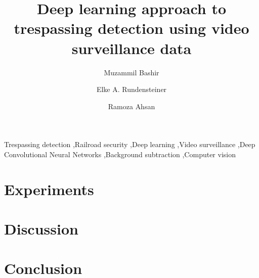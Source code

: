 \documentclass[preprint,3p,times,twocolumn]{elsarticle}
\begin{document}
\begin{frontmatter}
\title{Deep learning approach to trespassing detection using video surveillance data}


\author{Muzammil Bashir}
\author{Elke A. Rundensteiner}
\author{Ramoza Ahsan}

\address{Department of Computer Science, Worcester Polytechnic Institute, United States}





\begin{keyword}
Trespassing detection \sep Railroad security \sep Deep learning \sep Video surveillance \sep Deep Convolutional Neural Networks \sep Background subtraction \sep Computer vision
\end{keyword}

\end{frontmatter}





\section{Experiments}
\section{Discussion}
\section{Conclusion}




\end{document}
